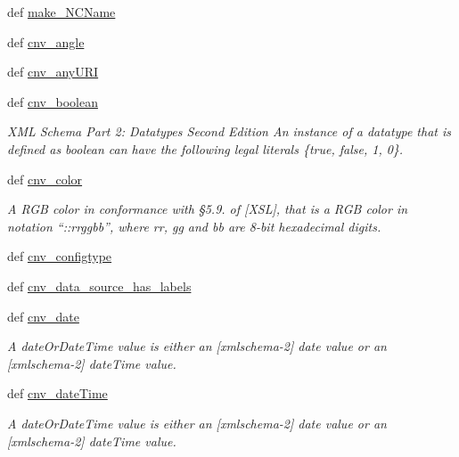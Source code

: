 \begin{DoxyCompactItemize}
\item 
def \hyperlink{namespaceodf_1_1attrconverters_a6755b6a5aedaf9689050ad84c4ede320}{make\+\_\+\+N\+C\+Name}
\item 
def \hyperlink{namespaceodf_1_1attrconverters_a9095129a551bea37c562ca4755046cd5}{cnv\+\_\+angle}
\item 
def \hyperlink{namespaceodf_1_1attrconverters_a82c1b6c29808feb95b772592f02d72b7}{cnv\+\_\+any\+U\+R\+I}
\item 
def \hyperlink{namespaceodf_1_1attrconverters_ad67560fa69c22fbde091692366afcaa2}{cnv\+\_\+boolean}
\begin{DoxyCompactList}\small\item\em X\+M\+L Schema Part 2\+: Datatypes Second Edition An instance of a datatype that is defined as boolean can have the following legal literals \{true, false, 1, 0\}. \end{DoxyCompactList}\item 
def \hyperlink{namespaceodf_1_1attrconverters_ad58e91696a8ed07acfe0a96081b572cc}{cnv\+\_\+color}
\begin{DoxyCompactList}\small\item\em A R\+G\+B color in conformance with §5.9. of \mbox{[}X\+S\+L\mbox{]}, that is a R\+G\+B color in notation “\+::rrggbb”, where rr, gg and bb are 8-\/bit hexadecimal digits. \end{DoxyCompactList}\item 
def \hyperlink{namespaceodf_1_1attrconverters_abce4fd4f50aa58e972ab29849a77ff26}{cnv\+\_\+configtype}
\item 
def \hyperlink{namespaceodf_1_1attrconverters_a1b21b2273d9d564bd72b12b74ff33239}{cnv\+\_\+data\+\_\+source\+\_\+has\+\_\+labels}
\item 
def \hyperlink{namespaceodf_1_1attrconverters_afae5bcb78db7d677b7a335bc9f14da10}{cnv\+\_\+date}
\begin{DoxyCompactList}\small\item\em A date\+Or\+Date\+Time value is either an \mbox{[}xmlschema-\/2\mbox{]} date value or an \mbox{[}xmlschema-\/2\mbox{]} date\+Time value. \end{DoxyCompactList}\item 
def \hyperlink{namespaceodf_1_1attrconverters_a40fcc8faf27993063f39d01dd5033955}{cnv\+\_\+date\+Time}
\begin{DoxyCompactList}\small\item\em A date\+Or\+Date\+Time value is either an \mbox{[}xmlschema-\/2\mbox{]} date value or an \mbox{[}xmlschema-\/2\mbox{]} date\+Time value. \end{DoxyCompactList}\item 

\end{DoxyCompactItemize}
